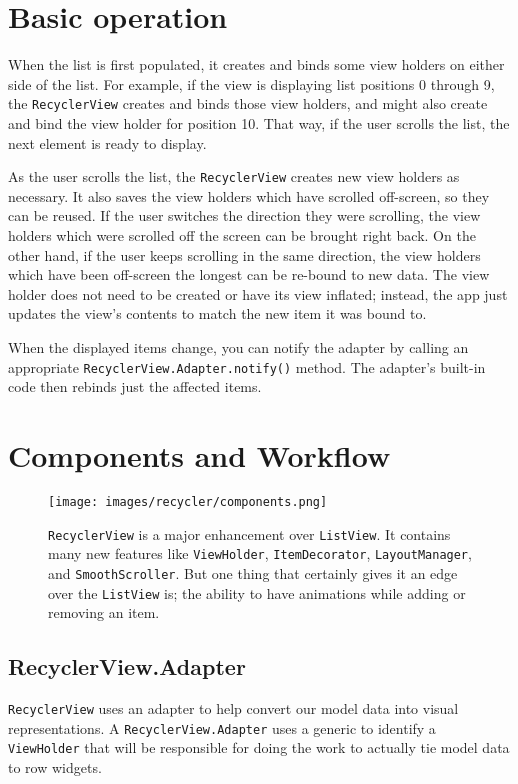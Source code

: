 \section{Basic operation}
When the list is first populated, it creates and binds some view holders on either side of the list. For example, if the view is displaying list positions 0 through 9, the \lstinline!RecyclerView! creates and binds those view holders, and might also create and bind the view holder for position 10. That way, if the user scrolls the list, the next element is ready to display.

As the user scrolls the list, the \lstinline!RecyclerView! creates new view holders as necessary. It also saves the view holders which have scrolled off-screen, so they can be reused. If the user switches the direction they were scrolling, the view holders which were scrolled off the screen can be brought right back. On the other hand, if the user keeps scrolling in the same direction, the view holders which have been off-screen the longest can be re-bound to new data. The view holder does not need to be created or have its view inflated; instead, the app just updates the view's contents to match the new item it was bound to.

When the displayed items change, you can notify the adapter by calling an appropriate \lstinline!RecyclerView.Adapter.notify()! method. The adapter's built-in code then rebinds just the affected items.

\section{Components and Workflow}

\begin{figure}
	\texttt{[image: images/recycler/components.png]}
	\caption{ \lstinline!RecyclerView! is a major enhancement over \lstinline!ListView!. It contains many new features like \lstinline!ViewHolder!, \lstinline!ItemDecorator!, \lstinline!LayoutManager!, and \lstinline!SmoothScroller!. But one thing that certainly gives it an edge over the \lstinline!ListView! is; the ability to have animations while adding or removing an item. }
	\label{fig:recyclercomponents}
\end{figure}


\subsection{RecyclerView.Adapter}
\lstinline!RecyclerView! uses an adapter to help convert our model data
into visual representations. A \lstinline!RecyclerView.Adapter!  uses a generic to identify a \lstinline!ViewHolder! that will be responsible for doing the work to actually tie model data to row widgets.

